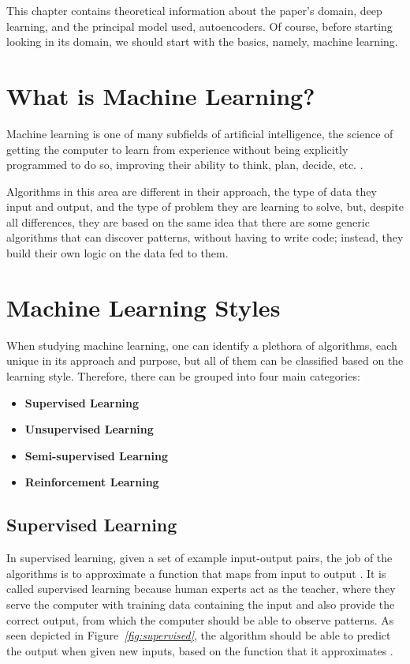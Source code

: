 This chapter contains theoretical information about the paper's domain, deep learning,
and the principal model used, autoencoders.
Of course, before starting looking in its domain,
we should start with the basics, namely, machine learning.
\section{What is Machine Learning?}

Machine learning is one of many subfields of artificial intelligence,
the science of getting the computer to learn from experience
without being explicitly programmed to do so,
improving their ability to think, plan, decide, etc. \cite{whatIsML}.\par
Algorithms in this area are different in their approach, the type of data they input and output,
and the type of problem they are learning to
solve, but, despite all differences, they are based on the same idea that there are some
generic algorithms that can discover patterns,
without having to write code; instead, they build their own logic on the data fed to them.

\section{Machine Learning Styles}
When studying machine learning, one can identify a plethora of algorithms,
each unique in its approach and purpose, but all of them can be classified
based on the learning style. Therefore, there can be grouped into four main categories:
\begin{itemize}
    \item \textbf{Supervised Learning}
    \item \textbf{Unsupervised Learning}
    \item \textbf{Semi-supervised Learning}
    \item \textbf{Reinforcement Learning}
\end{itemize}
\vspace{0.5cm}

\subsection{Supervised Learning}
In supervised learning, given a set of example input-output pairs,
the job of the algorithms is to approximate a function that maps from input to output \cite{amai}.
It is called supervised learning because human experts act as the teacher,
where they serve the computer with training data containing the input and
also provide the correct output, from which the computer should be able to observe patterns.
As seen depicted in Figure\emph{~\ref{fig:supervised}},
the algorithm should be able to predict the output when given new inputs,
based on the function that it approximates \cite{typesMLMedium}.

